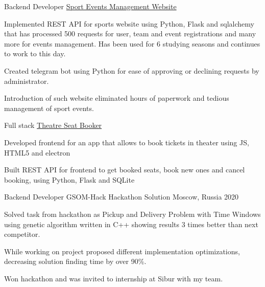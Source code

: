 

\begin{cventries}

  \cventry
  {Backend Developer} %
  {\href{https://github.com/SphericalPotatoInVacuum/lksh_sport}{Sport Events Management Website}} %
  {} %
  {} %
  {
    \begin{cvitems} %
      \item Implemented REST API for sports website using Python, Flask and sqlalchemy that has processed 500 requests for user,
      team and event registrations and many more for events management. Has been used for 6 studying seasons and continues to work to this day.
      \item Created telegram bot using Python for ease of approving or declining requests by administrator.
      \item Introduction of such website eliminated hours of paperwork and tedious management of sport events.
    \end{cvitems}
  }

  \cventry
  {Full stack} %
  {\href{https://github.com/SphericalPotatoInVacuum/TheatreBooker}{Theatre Seat Booker}} %
  {} %
  {} %
  {
    \begin{cvitems} %
      \item Developed frontend for an app that allows to book tickets in theater using JS, HTML5 and electron
      \item Built REST API for frontend to get booked seats, book new ones and cancel booking, using Python, Flask and SQLite
    \end{cvitems}
  }


  \cventry
  {Backend Developer} %
  {GSOM-Hack Hackathon Solution} %
  {Moscow, Russia} %
  {2020} %
  {
    \begin{cvitems}
      \item Solved task from hackathon as Pickup and Delivery Problem with Time Windows using
      genetic algorithm written in C++ showing results 3 times better than next competitor.
      \item While working on project proposed different implementation optimizations, decreasing solution finding time by over 90\%.
      \item Won hackathon and was invited to internship at Sibur with my team.
    \end{cvitems}
  }
\end{cventries}
